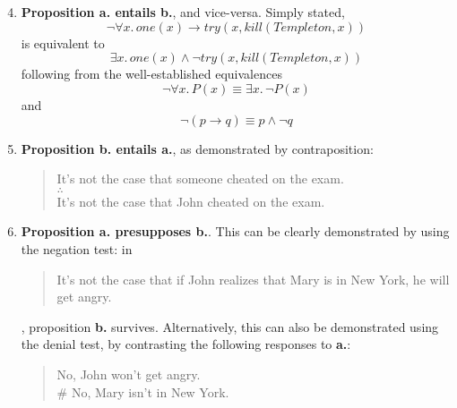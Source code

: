 \documentclass[12pt,a4paper]{article}
\begin{document}
\part{}
\begin{enumerate}
\setcounter{enumi}{3}
\item \textbf{Proposition a. entails b.}, and vice-versa. Simply stated,
\[
\neg \forall x.\, one(x) \rightarrow try(x, kill(Templeton, x))
\]
is equivalent to
\[
\exists x.\, one(x) \wedge \neg try(x, kill(Templeton, x))
\]
following from the well-established equivalences
\[
\neg \forall x.\, P(x) \equiv \exists x.\, \neg P(x)
\]
and
\[
\neg (p \rightarrow q) \equiv p \wedge \neg q
\]

\item \textbf{Proposition b. entails a.}, as demonstrated by contraposition:
\begin{quote}
It's not the case that someone cheated on the exam.\\
$\therefore$\\
It's not the case that John cheated on the exam.
\end{quote}

\item \textbf{Proposition a. presupposes b.}. This can be clearly demonstrated by using the negation test: in
\begin{quote}
It's not the case that if John realizes that Mary is in New York, he will get angry.
\end{quote}
, proposition \textbf{b.} survives. Alternatively, this can also be demonstrated using the denial test, by contrasting the following responses to \textbf{a.}:
\begin{quote}
No, John won't get angry.\\
\# No, Mary isn't in New York.
\end{quote}
\end{enumerate}
\end{document}
